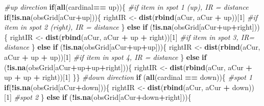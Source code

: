 \documentclass[]{article}
\newenvironment{Shaded}{\begin{snugshade}}{\end{snugshade}}
\newcommand{\CommentTok}[1]{\textcolor[rgb]{0.56,0.35,0.01}{\textit{#1}}}
\newcommand{\ControlFlowTok}[1]{\textcolor[rgb]{0.13,0.29,0.53}{\textbf{#1}}}
\newcommand{\DecValTok}[1]{\textcolor[rgb]{0.00,0.00,0.81}{#1}}
\newcommand{\KeywordTok}[1]{\textcolor[rgb]{0.13,0.29,0.53}{\textbf{#1}}}
\newcommand{\NormalTok}[1]{#1}
\newcommand{\OperatorTok}[1]{\textcolor[rgb]{0.81,0.36,0.00}{\textbf{#1}}}
\newcommand{\StringTok}[1]{\textcolor[rgb]{0.31,0.60,0.02}{#1}}
\begin{document}
\begin{Shaded}
\begin{Highlighting}[]
  
  \CommentTok{#up direction}
  \ControlFlowTok{if}\NormalTok{(}\KeywordTok{all}\NormalTok{(cardinal}\OperatorTok{==}\StringTok{ }\NormalTok{up))\{ }
    \CommentTok{#if item in spot 1 (up), IR = distance}
    \ControlFlowTok{if}\NormalTok{(}\OperatorTok{!}\KeywordTok{is.na}\NormalTok{(obsGrid[aCur}\OperatorTok{+}\NormalTok{up]))\{}
\NormalTok{      rightIR <-}\StringTok{ }\KeywordTok{dist}\NormalTok{(}\KeywordTok{rbind}\NormalTok{(aCur, aCur }\OperatorTok{+}\StringTok{ }\NormalTok{up))[}\DecValTok{1}\NormalTok{]}
      \CommentTok{#if item in spot 2 (right), IR = distance}
\NormalTok{    \} }\ControlFlowTok{else} \ControlFlowTok{if}\NormalTok{ (}\OperatorTok{!}\KeywordTok{is.na}\NormalTok{(obsGrid[aCur}\OperatorTok{+}\NormalTok{up}\OperatorTok{+}\NormalTok{right]))\{}
\NormalTok{      rightIR <-}\StringTok{ }\KeywordTok{dist}\NormalTok{(}\KeywordTok{rbind}\NormalTok{(aCur, aCur }\OperatorTok{+}\StringTok{ }\NormalTok{up }\OperatorTok{+}\StringTok{ }\NormalTok{right))[}\DecValTok{1}\NormalTok{]}
      \CommentTok{#if item in spot 3, IR= distance}
\NormalTok{    \} }\ControlFlowTok{else} \ControlFlowTok{if}\NormalTok{ (}\OperatorTok{!}\KeywordTok{is.na}\NormalTok{(obsGrid[aCur}\OperatorTok{+}\NormalTok{up}\OperatorTok{+}\NormalTok{up]))\{}
\NormalTok{      rightIR <-}\StringTok{ }\KeywordTok{dist}\NormalTok{(}\KeywordTok{rbind}\NormalTok{(aCur, aCur }\OperatorTok{+}\StringTok{ }\NormalTok{up }\OperatorTok{+}\StringTok{ }\NormalTok{up))[}\DecValTok{1}\NormalTok{]}
      \CommentTok{#if item in spot 4, IR = distance}
\NormalTok{    \} }\ControlFlowTok{else} \ControlFlowTok{if}\NormalTok{ (}\OperatorTok{!}\KeywordTok{is.na}\NormalTok{(obsGrid[aCur}\OperatorTok{+}\NormalTok{up}\OperatorTok{+}\NormalTok{up}\OperatorTok{+}\NormalTok{right]))\{}
\NormalTok{      rightIR <-}\StringTok{ }\KeywordTok{dist}\NormalTok{(}\KeywordTok{rbind}\NormalTok{(aCur, aCur }\OperatorTok{+}\StringTok{ }\NormalTok{up }\OperatorTok{+}\StringTok{ }\NormalTok{up }\OperatorTok{+}\StringTok{ }\NormalTok{right))[}\DecValTok{1}\NormalTok{]}
\NormalTok{    \}\}}
  \CommentTok{#down direction}
  \ControlFlowTok{if}\NormalTok{ (}\KeywordTok{all}\NormalTok{(cardinal }\OperatorTok{==}\StringTok{ }\NormalTok{down))\{}
    \CommentTok{#spot 1}
    \ControlFlowTok{if}\NormalTok{(}\OperatorTok{!}\KeywordTok{is.na}\NormalTok{(obsGrid[aCur}\OperatorTok{+}\NormalTok{down]))\{}
\NormalTok{         rightIR <-}\StringTok{ }\KeywordTok{dist}\NormalTok{(}\KeywordTok{rbind}\NormalTok{(aCur, aCur }\OperatorTok{+}\StringTok{ }\NormalTok{down))[}\DecValTok{1}\NormalTok{]}
         \CommentTok{#spot 2}
\NormalTok{    \} }\ControlFlowTok{else} \ControlFlowTok{if}\NormalTok{ (}\OperatorTok{!}\KeywordTok{is.na}\NormalTok{(obsGrid[aCur}\OperatorTok{+}\NormalTok{down}\OperatorTok{+}\NormalTok{right]))\{}

\end{Highlighting}
\end{Shaded}
\end{document}
